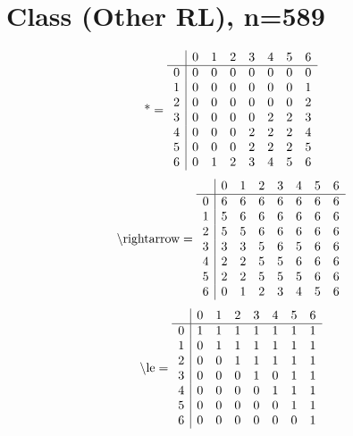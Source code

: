 \documentclass[11pt]{article}
\begin{document}
\section{Class (Other RL), n=589}
\[\text{*} = 
\begin{array}{r | r r r r r r r}
 & 0 & 1 & 2 & 3 & 4 & 5 & 6 \\ \hline
0 & 0 & 0 & 0 & 0 & 0 & 0 & 0 \\
1 & 0 & 0 & 0 & 0 & 0 & 0 & 1 \\
2 & 0 & 0 & 0 & 0 & 0 & 0 & 2 \\
3 & 0 & 0 & 0 & 0 & 2 & 2 & 3 \\
4 & 0 & 0 & 0 & 2 & 2 & 2 & 4 \\
5 & 0 & 0 & 0 & 2 & 2 & 2 & 5 \\
6 & 0 & 1 & 2 & 3 & 4 & 5 & 6 \\
\end{array}
\]
\[\text{\textbackslash rightarrow} = 
\begin{array}{r | r r r r r r r}
 & 0 & 1 & 2 & 3 & 4 & 5 & 6 \\ \hline
0 & 6 & 6 & 6 & 6 & 6 & 6 & 6 \\
1 & 5 & 6 & 6 & 6 & 6 & 6 & 6 \\
2 & 5 & 5 & 6 & 6 & 6 & 6 & 6 \\
3 & 3 & 3 & 5 & 6 & 5 & 6 & 6 \\
4 & 2 & 2 & 5 & 5 & 6 & 6 & 6 \\
5 & 2 & 2 & 5 & 5 & 5 & 6 & 6 \\
6 & 0 & 1 & 2 & 3 & 4 & 5 & 6 \\
\end{array}
\]
\[\text{\textbackslash le} = 
\begin{array}{r | r r r r r r r}
 & 0 & 1 & 2 & 3 & 4 & 5 & 6 \\ \hline
0 & 1 & 1 & 1 & 1 & 1 & 1 & 1 \\
1 & 0 & 1 & 1 & 1 & 1 & 1 & 1 \\
2 & 0 & 0 & 1 & 1 & 1 & 1 & 1 \\
3 & 0 & 0 & 0 & 1 & 0 & 1 & 1 \\
4 & 0 & 0 & 0 & 0 & 1 & 1 & 1 \\
5 & 0 & 0 & 0 & 0 & 0 & 1 & 1 \\
6 & 0 & 0 & 0 & 0 & 0 & 0 & 1 \\
\end{array}
\]
\end{document}
